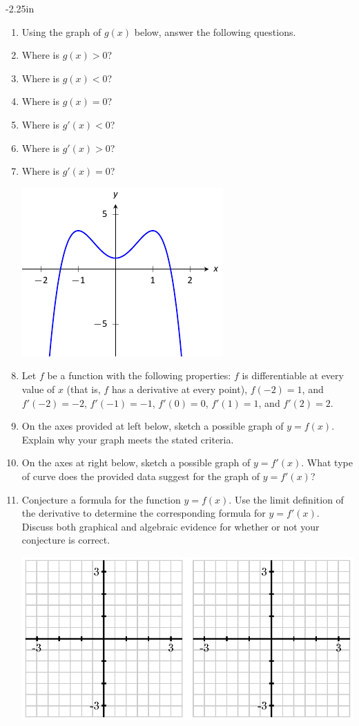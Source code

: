 \begin{adjustwidth*}{}{-2.25in}
\begin{multicols*}{2}
\begin{enumerate}[1),resume]
\item Using the graph of $g(x)$ below, answer the following questions.
\ba
\item Where is $g(x) > 0$?
\item Where is $g(x) < 0$?
\item Where is $g(x) = 0$?
\item Where is $g'(x) < 0$?
\item Where is $g'(x) > 0$?
\item Where is $g'(x) = 0$?
\ea

\includegraphics[scale=.8]{figures/fig02_01_ex_30}

\item Let $f$ be a function with the following properties:  $f$ is differentiable at every value of $x$ (that is, $f$ has a derivative at every point), $f(-2) = 1$, and $f'(-2) = -2$, $f'(-1) = -1$, $f'(0) = 0$, $f'(1) = 1$, and $f'(2) = 2$.
\ba
	\item On the axes provided at left below, sketch a possible graph of $y = f(x)$.  Explain why your graph meets the stated criteria.
	\item On the axes at right below, sketch a possible graph of $y = f'(x)$.  What type of curve does the provided data suggest for the graph of $y = f'(x)$?
	\item Conjecture a formula for the function $y = f(x)$.  Use the limit definition of the derivative to determine the corresponding formula for $y = f'(x)$.  Discuss both graphical and algebraic evidence for whether or not your conjecture is correct.
\ea

\includegraphics[scale=.75]{figures/1_2_Ez3.eps} 
\end{enumerate}


\end{multicols*}
\end{adjustwidth*}
